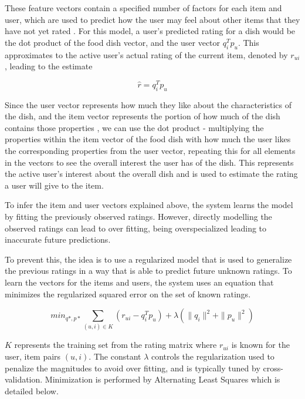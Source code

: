 These feature vectors contain a specified number of factors for each item and user, which are used to predict how the user may feel about other items that they have not yet rated \cite{koren2009matrix}. For this model, a user's predicted rating for a dish would be the dot product of the food dish vector, and the user vector \begin{math} q_{i}^T p_{u} \end{math}. This approximates to the active user's actual rating of the current item, denoted by \begin{math} r_{ui} \end{math}, leading to the estimate \cite{koren2009matrix}

\begin{equation}\label{eq:1}\tag{1} \widehat{r} = q_{i}^T p_{u} \end{equation}

Since the user vector represents how much they like about the characteristics of the dish, and the item vector represents the portion of how much of the dish contains those properties \cite{koren2009matrix}, we can use the dot product - multiplying the properties within the item vector of the food dish with how much the user likes the corresponding properties from the user vector, repeating this for all elements in the vectors to see the overall interest the user has of the dish. This represents the active user's interest about the overall dish and is used to estimate the rating a user will give to the item. 

To infer the item and user vectors explained above, the system learns the model by fitting the previously observed ratings. However, directly modelling the observed ratings can lead to over fitting, being overspecialized leading to inaccurate future predictions.

To prevent this, the idea is to use a regularized model that is used to generalize the previous ratings in a way that is able to predict future unknown ratings. To learn the vectors for the items and users, the system uses an equation that minimizes the regularized squared error on the set of known ratings.

\begin{equation}\label{eq:2}\tag{2}
\displaystyle min_{q*,p*} \sum_{ (u,i) \in K} (r_{ui} - q_{i}^T p_{u}) + \lambda (\| q_{i} \|^2 + \| p_{u} \|^2 )
\end{equation}

\begin{math} K \end{math} represents the training set from the rating matrix where \begin{math} r_{ui} \end{math} is known for the user, item pairs \begin{math} (u,i) \end{math}. The constant \begin{math}\lambda\end{math} controls the regularization used to penalize the magnitudes to avoid over fitting, and is typically tuned by cross-validation. Minimization is performed by Alternating Least Squares \cite{koren2011}  which is detailed below. 

